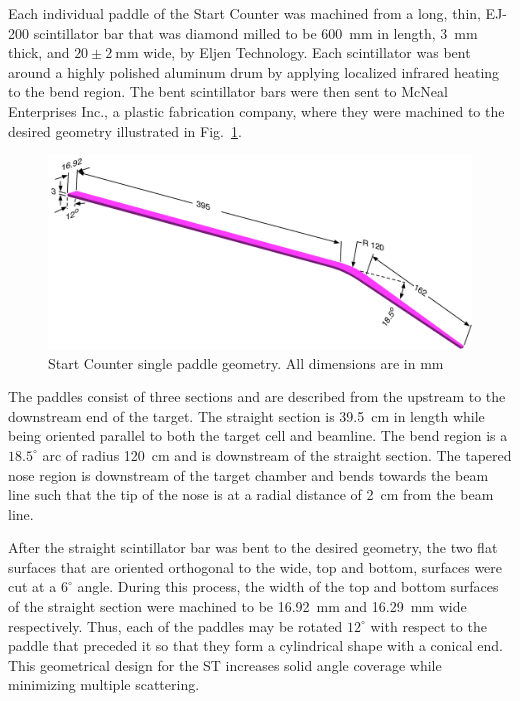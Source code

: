 Each individual paddle of the Start Counter was machined from a long, thin,  EJ-200 scintillator bar that was diamond milled to be 600~mm in length, 3~mm thick, and $\mathrm{20 \pm 2\ mm}$ wide, by Eljen Technology.  Each scintillator was bent around a highly polished aluminum drum by applying localized infrared heating to the bend region.  The bent scintillator bars were then sent to McNeal Enterprises Inc.\cite{mcneal}, a plastic fabrication company, where they were machined to the desired geometry illustrated in Fig.~\ref{fig:stpaddleiso}.
	\begin{figure}[!htb]
		\centering
		\includegraphics[width=1.0\columnwidth]{design/figs/scintillator.pdf}
		\caption{Start Counter single paddle geometry. All dimensions are in mm}
		\label{fig:stpaddleiso}
	\end{figure}

The paddles consist of three sections and are described from the upstream to the downstream end of the target.  The straight section is 39.5~cm in length while being oriented parallel to both the target cell and beamline.  The bend region is a $18.5^{\circ}$ arc of radius 120~cm and is downstream of the straight section. The tapered nose region is downstream of the target chamber and bends towards the beam line such that the tip of the nose is at a radial distance of 2~cm from the beam line.  

After the straight scintillator bar was bent to the desired geometry, the two flat surfaces that are oriented orthogonal to the wide, top and bottom, surfaces were cut at a $6^{\circ}$ angle.  During this process, the width of the top and bottom surfaces of the straight section were machined to be 16.92~mm and 16.29~mm wide respectively. Thus, each of the paddles may be rotated $12^{\circ}$ with respect to the paddle that preceded it so that they form a cylindrical shape with a conical end.  This geometrical design for the ST increases solid angle coverage while minimizing multiple scattering.  

